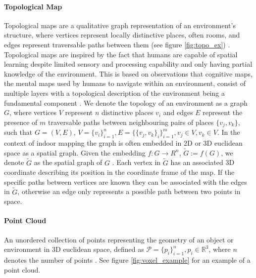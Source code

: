 \paragraph{Topological Map} 
Topological maps are a qualitative graph representation of an environment's structure, where vertices represent locally distinctive places, often rooms, and edges represent traversable paths between them  (see figure \ref{fig:topo_ex}) \citep{thrun_learning_1998,kuipers_robust_1988}. Topological maps are inspired by the fact that humans are capable of spatial learning despite limited sensory and processing capability and only having partial knowledge of the environment. This is based on observations that cognitive maps, the mental maps used by humans to navigate within an environment, consist of multiple layers with a topological description of the environment being a fundamental component \citep{kuipers_robust_1988,kuipers_modeling_1978}. We denote the topology of an environment as a graph \(G\), where vertices \(V\) represent \(n\) distinctive places \(v_i\) and edges \(E\) represent the presence of \(m\) traversable paths between neighbouring pairs of places \(\{v_j,v_k\}\), such that \(G=(V, E)\), \(V=\{v_i\}_{i=1}^n, E=\{\{v_j,v_k\}_i\}_{i=1}^m, v_j \in V, v_k \in V\). In the context of indoor mapping the graph is often embedded in 2D or 3D euclidean space as a spatial graph. Given the embedding \(f : G \rightarrow R^n\), \( \widetilde{G}:=f(G)\), we denote \(\widetilde{G}\) as the spatial graph of \(G\) \citep{kobayashi_spatial_1994}. Each vertex in \(\widetilde{G}\) has an associated 3D coordinate describing its position in the coordinate frame of the map. If the specific paths between vertices are known they can be associated with the edges in \(\widetilde{G}\), otherwise an edge only represents a possible path between two points in space.

\paragraph{Point Cloud} An unordered collection of points representing the geometry of an object or environment in 3D euclidean space, defined as \(\mathcal{P}=\{p_i\}_{i=1}^n, p_i \in \mathbb{R}^3\), where \(n\) denotes the number of points \citep{volodine_point_2007}. See figure \ref{fig:voxel_example} for an example of a point cloud.

